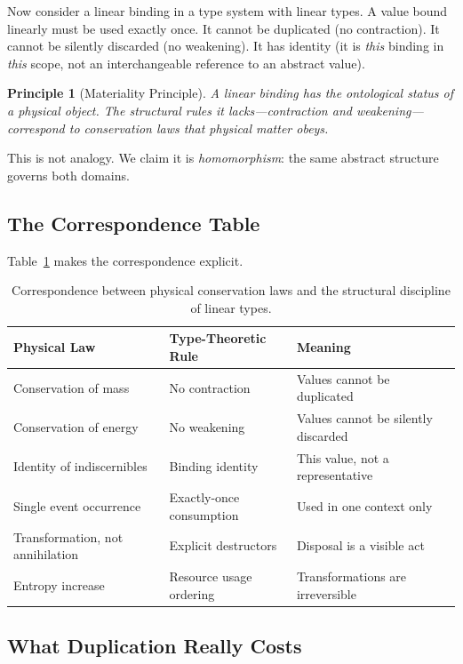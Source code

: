 \documentclass[11pt,a4paper]{article}
\newtheorem{principle}{Principle}
\begin{document}
Now consider a linear binding in a type system with linear types.
A value bound linearly must be used exactly once. It cannot be
duplicated (no contraction). It cannot be silently discarded (no
weakening). It has identity (it is \emph{this} binding in \emph{this}
scope, not an interchangeable reference to an abstract value).

\begin{principle}[Materiality Principle]
A linear binding has the ontological status of a physical object. The
structural rules it lacks---contraction and weakening---correspond to
conservation laws that physical matter obeys.
\end{principle}

This is not analogy. We claim it is \emph{homomorphism}: the same
abstract structure governs both domains.

\subsection{The Correspondence Table}

Table~\ref{tab:correspondence} makes the correspondence explicit.

\begin{table}[ht]
\centering
\begin{tabular}{@{}lll@{}}
\toprule
\textbf{Physical Law} & \textbf{Type-Theoretic Rule} & \textbf{Meaning} \\
\midrule
Conservation of mass & No contraction & Values cannot be duplicated \\
Conservation of energy & No weakening & Values cannot be silently discarded \\
Identity of indiscernibles & Binding identity & This value, not a representative \\
Single event occurrence & Exactly-once consumption & Used in one context only \\
Transformation, not annihilation & Explicit destructors & Disposal is a visible act \\
Entropy increase & Resource usage ordering & Transformations are irreversible \\
\bottomrule
\end{tabular}
\caption{Correspondence between physical conservation laws and the
  structural discipline of linear types.}
\label{tab:correspondence}
\end{table}

\subsection{What Duplication Really Costs}
\end{document}
